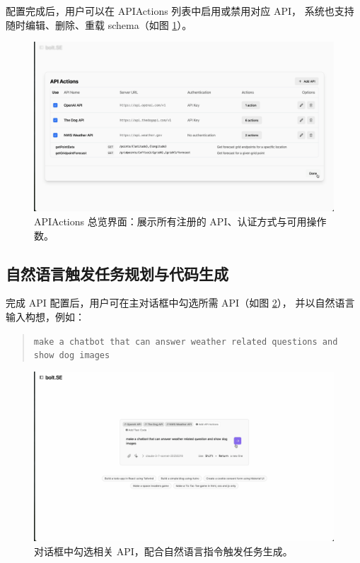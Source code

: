 配置完成后，用户可以在 APIActions 列表中启用或禁用对应 API，
系统也支持随时编辑、删除、重载 schema（如图 \ref{fig:demo_table}）。

\begin{figure}[htbp]
  \centering
  \includegraphics[width=\textwidth]{figures/screenshots/api-actions/demo_actions_table.png}
  \caption{APIActions 总览界面：展示所有注册的 API、认证方式与可用操作数。}
  \label{fig:demo_table}
\end{figure}

\subsection{自然语言触发任务规划与代码生成}

完成 API 配置后，用户可在主对话框中勾选所需 API（如图 \ref{fig:demo_prompt}），
并以自然语言输入构想，例如：

\begin{quote}
\texttt{make a chatbot that can answer weather related questions and show dog images}
\end{quote}

\begin{figure}[htbp]
  \centering
  \includegraphics[width=\textwidth]{figures/screenshots/api-actions/demo_prompt_tags.png}
  \caption{对话框中勾选相关 API，配合自然语言指令触发任务生成。}
  \label{fig:demo_prompt}
\end{figure}

